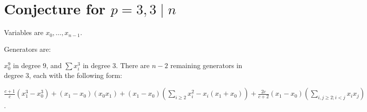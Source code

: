 \documentclass{article}
\numberwithin{equation}{section}
\begin{document}
\section{Conjecture for $p=3, 3 \mid n$}

Variables are $x_0,\dots,x_{n-1}$. 

Generators are:

$x_0^9$ in degree $9$, and $\sum x_i^3$ in degree $3$. There are $n-2$ remaining generators in degree $3$, each with the following form:

$\frac{c+1}{c}(x_1^3-x_0^3) +(x_1-x_0)(x_0x_1)+(x_1-x_0)\left(\sum_{i \ge 2}x_i^2-x_i(x_1+x_0)\right)+\frac{2c}{c+2}(x_1-x_0)\left(\sum_{i,j \ge 2; i < j}x_ix_j\right)$.


%
%
%
%
%
%
%
%
%
\end{document}
